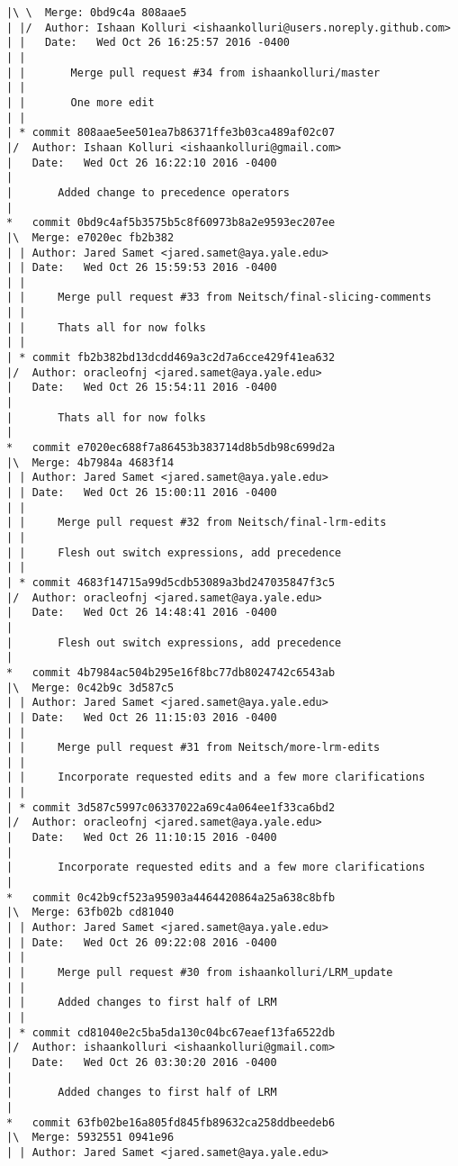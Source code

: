 \begin{lstlisting}
|\ \  Merge: 0bd9c4a 808aae5
| |/  Author: Ishaan Kolluri <ishaankolluri@users.noreply.github.com>
| |   Date:   Wed Oct 26 16:25:57 2016 -0400
| |   
| |       Merge pull request #34 from ishaankolluri/master
| |       
| |       One more edit
| |   
| * commit 808aae5ee501ea7b86371ffe3b03ca489af02c07
|/  Author: Ishaan Kolluri <ishaankolluri@gmail.com>
|   Date:   Wed Oct 26 16:22:10 2016 -0400
|   
|       Added change to precedence operators
|    
*   commit 0bd9c4af5b3575b5c8f60973b8a2e9593ec207ee
|\  Merge: e7020ec fb2b382
| | Author: Jared Samet <jared.samet@aya.yale.edu>
| | Date:   Wed Oct 26 15:59:53 2016 -0400
| | 
| |     Merge pull request #33 from Neitsch/final-slicing-comments
| |     
| |     Thats all for now folks
| |   
| * commit fb2b382bd13dcdd469a3c2d7a6cce429f41ea632
|/  Author: oracleofnj <jared.samet@aya.yale.edu>
|   Date:   Wed Oct 26 15:54:11 2016 -0400
|   
|       Thats all for now folks
|    
*   commit e7020ec688f7a86453b383714d8b5db98c699d2a
|\  Merge: 4b7984a 4683f14
| | Author: Jared Samet <jared.samet@aya.yale.edu>
| | Date:   Wed Oct 26 15:00:11 2016 -0400
| | 
| |     Merge pull request #32 from Neitsch/final-lrm-edits
| |     
| |     Flesh out switch expressions, add precedence
| |   
| * commit 4683f14715a99d5cdb53089a3bd247035847f3c5
|/  Author: oracleofnj <jared.samet@aya.yale.edu>
|   Date:   Wed Oct 26 14:48:41 2016 -0400
|   
|       Flesh out switch expressions, add precedence
|    
*   commit 4b7984ac504b295e16f8bc77db8024742c6543ab
|\  Merge: 0c42b9c 3d587c5
| | Author: Jared Samet <jared.samet@aya.yale.edu>
| | Date:   Wed Oct 26 11:15:03 2016 -0400
| | 
| |     Merge pull request #31 from Neitsch/more-lrm-edits
| |     
| |     Incorporate requested edits and a few more clarifications
| |   
| * commit 3d587c5997c06337022a69c4a064ee1f33ca6bd2
|/  Author: oracleofnj <jared.samet@aya.yale.edu>
|   Date:   Wed Oct 26 11:10:15 2016 -0400
|   
|       Incorporate requested edits and a few more clarifications
|    
*   commit 0c42b9cf523a95903a4464420864a25a638c8bfb
|\  Merge: 63fb02b cd81040
| | Author: Jared Samet <jared.samet@aya.yale.edu>
| | Date:   Wed Oct 26 09:22:08 2016 -0400
| | 
| |     Merge pull request #30 from ishaankolluri/LRM_update
| |     
| |     Added changes to first half of LRM
| |   
| * commit cd81040e2c5ba5da130c04bc67eaef13fa6522db
|/  Author: ishaankolluri <ishaankolluri@gmail.com>
|   Date:   Wed Oct 26 03:30:20 2016 -0400
|   
|       Added changes to first half of LRM
|    
*   commit 63fb02be16a805fd845fb89632ca258ddbeedeb6
|\  Merge: 5932551 0941e96
| | Author: Jared Samet <jared.samet@aya.yale.edu>

\end{lstlisting}
